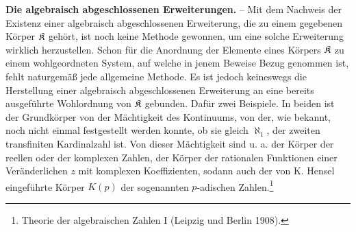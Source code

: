 \textbf{Die algebraisch abgeschlossenen Erweiterungen.} -- Mit dem Nachweis der Existenz einer algebraisch abgeschlossenen Erweiterung, die zu einem gegebenen Körper \(\mathfrak K\) gehört, ist noch keine Methode gewonnen, um eine solche Erweiterung wirklich herzustellen. Schon für die Anordnung der Elemente eines Körpers \(\mathfrak K\) zu einem wohlgeordneten System, auf welche in jenem Beweise Bezug genommen ist, fehlt naturgemäß jede allgemeine Methode. Es ist jedoch keineswegs die Herstellung einer algebraisch abgeschlossenen Erweiterung an eine bereits ausgeführte Wohlordnung von \(\mathfrak K\) gebunden. Dafür zwei Beispiele. In beiden ist der Grundkörper von der Mächtigkeit des Kontinuums, von der, wie bekannt, noch nicht einmal festgestellt werden konnte, ob sie gleich \(\aleph_1\), der zweiten transfiniten Kardinalzahl ist. Von dieser Mächtigkeit sind u. a. der Körper der reellen oder der komplexen Zahlen, der Körper der rationalen Funktionen einer Veränderlichen \(z\) mit komplexen Koeffizienten, sodann auch der von K. Hensel eingeführte Körper \(K(p)\) der sogenannten \(p\)-adischen Zahlen.\footnote{Theorie der algebraischen Zahlen I (Leipzig und Berlin 1908).}

